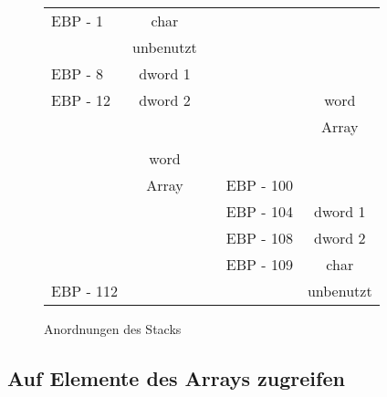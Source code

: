 \begin{figure}[ht]
\centering
\begin{tabular}{l|c|ll|c|}
 \cline{2-2} \cline{5-5}
 EBP - 1   & char      & \hspace{2em} &           & \\
 \cline{2-2}
           & unbenutzt &              &           & \\
 \cline{2-2}
 EBP - 8   & dword 1   &              &           & \\
 \cline{2-2}
 EBP - 12  & dword 2   &              &           & word \\
 \cline{2-2}
           &           &              &           & Array \\
           &           &              &           & \\
           & word      &              &           & \\
           & Array     &              & EBP - 100 & \\
 \cline{5-5}
           &           &              & EBP - 104 & dword 1 \\
 \cline{5-5}
           &           &              & EBP - 108 & dword 2 \\
 \cline{5-5}
           &           &              & EBP - 109 & char \\
 \cline{5-5}
 EBP - 112 &           &              &           & unbenutzt \\
 \cline{2-2} \cline{5-5}
\end{tabular}
\caption{Anordnungen des Stacks \label{fig:StackLayouts}}
\end{figure}

\subsection{Auf Elemente des Arrays zugreifen
}

